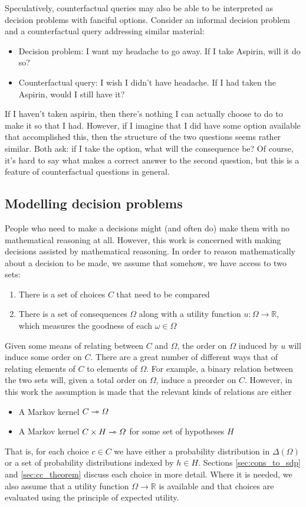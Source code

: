 Speculatively, counterfactual queries may also be able to be interpreted as decision problems with fanciful options. Consider an informal decision problem and a counterfactual query addressing similar material:
\begin{itemize}
    \item Decision problem: I want my headache to go away. If I take Aspirin, will it do so?
    \item Counterfactual query: I wish I didn't have headache. If I had taken the Aspirin, would I still have it?
\end{itemize}
If I haven't taken aspirin, then there's nothing I can actually choose to do to make it so that I had. However, if I imagine that I did have some option available that accomplished this, then the structure of the two questions seems rather similar. Both ask: if I take the option, what will the consequence be? Of course, it's hard to say what makes a correct answer to the second question, but this is a feature of counterfactual questions in general.

\subsection{Modelling decision problems}\label{sec:modelling_decision_problems}

People who need to make a decisions might (and often do) make them with no mathematical reasoning at all. However, this work is concerned with making decisions assisted by mathematical reasoning. In order to reason mathematically about a decision to be made, we assume that somehow, we have access to two sets:
\begin{enumerate}
    \item There is a set of choices $C$ that need to be compared
    \item There is a set of consequences $\Omega$ along with a utility function $u:\Omega\to \mathbb{R}$, which measures the goodness of each $\omega\in \Omega$
\end{enumerate}

Given some means of relating between $C$ and $\Omega$, the order on $\Omega$ induced by $u$ will induce some order on $C$. There are a great number of different ways that of relating elements of $C$ to elements of $\Omega$. For example, a binary relation between the two sets will, given a total order on $\Omega$, induce a preorder on $C$. However, in this work the assumption is made that the relevant kinds of relations are either
\begin{itemize}
    \item A Markov kernel $C\rightarrowtriangle \Omega$
    \item A Markov kernel $C\times H\rightarrowtriangle \Omega$ for some set of hypotheses $H$
\end{itemize}
That is, for each choice $c\in C$ we have either a probability distribution in $\Delta(\Omega)$ or a set of probability distributions indexed by $h\in H$. Sections \ref{sec:cons_to_sdp} and \ref{sec:cc_theorem} discuss each choice in more detail. Where it is needed, we also assume that a utility function $\Omega\to \mathbb{R}$ is available and that choices are evaluated using the principle of expected utility.


